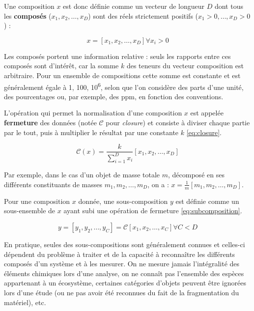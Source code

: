 \documentclass[
  french,
]{scrbook}
\begin{document}
Une composition \(x\) est donc définie comme un vecteur de longueur \(D\) dont tous les \textbf{composés} (\(x_{1}, x_{2}, \dotsc, x_{D}\)) sont des réels strictement positifs (\(x_{1} > 0, \dotsc, x_{D} > 0\)) :

\begin{equation}
    x = \left[ x_{1}, x_{2}, \dotsc, x_{D} \right] \forall x_{i} > 0
  \label{eq:composition}
\end{equation}

Les composés portent une information relative : seuls les rapports entre ces composés sont d'intérêt, car la somme \(k\) des teneurs du vecteur composition est arbitraire. Pour un ensemble de compositions cette somme est constante et est généralement égale à 1, 100, 10\textsuperscript{6}, selon que l'on considère des parts d'une unité, des pourcentages ou, par exemple, des ppm, en fonction des conventions.

L'opération qui permet la normalisation d'une composition \(x\) est appelée \textbf{fermeture} des données (notée \(\mathscr{C}\) pour \emph{closure}) et consiste à diviser chaque partie par le tout, puis à multiplier le résultat par une constante \(k\) \eqref{eq:closure}.

\begin{equation}
    \mathscr{C}(x) = \frac{k}{\sum_{i=1}^{D} x_{i}} \left[ x_{1}, x_{2}, \dotsc, x_{D} \right]
  \label{eq:closure}
\end{equation}

Par exemple, dans le cas d'un objet de masse totale \(m\), décomposé en ses différents constituants de masses \(m_{1}, m_{2}, \ldots, m_{D}\), on a : \(x = \frac{1}{m} \left[ m_{1}, m_{2}, \dotsc, m_{D} \right]\).

Pour une composition \(x\) donnée, une sous-composition \(y\) est définie comme un sous-ensemble de \(x\) ayant subi une opération de fermeture \eqref{eq:subcomposition}.

\begin{equation}
    y = \left[ y_{1}, y_{2}, \dotsc, y_{C} \right] = \mathscr{C} \left[x_{1}, x_{2}, \dotsc, x_{C} \right] \forall C < D
  \label{eq:subcomposition}
\end{equation}

\begin{tcolorbox}[fonttitle=\sffamily\bfseries\large,title=Remarque,colframe=darkblue]

En pratique, seules des sous-compositions sont généralement connues et celles-ci dépendent du problème à traiter et de la capacité à reconnaître les différents composés d'un système et à les mesurer. On ne mesure jamais l'intégralité des éléments chimiques lors d'une analyse, on ne connaît pas l'ensemble des espèces appartenant à un écosystème, certaines catégories d'objets peuvent être ignorées lors d'une étude (ou ne pas avoir été reconnues du fait de la fragmentation du matériel), etc.

\end{tcolorbox}
\end{document}
